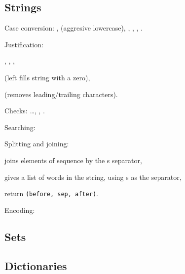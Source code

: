 \subsection{Strings}
\begin{enumx}
\item Case conversion: 
, 
 (aggresive lowercase), 
, 
, 
, 
.

\item Justification: 
\begin{itemx}
	\item {},
		  ,
	      ,

	\item {} 
	(left fills string with a zero),

	\item {} 
	(removes leading/trailing characters).
\end{itemx}

\item Checks:
\ldots,
, 
.

\item Searching:

\item Splitting and joining:
\begin{itemx}
	\item {} joins elements of sequence by the s separator,
	\item {} gives a list of words in the string, using s as the separator,
	\item {} return \texttt{(before, sep, after)}.
\end{itemx}

\item Encoding: 
\end{enumx}

\subsection{Sets}

\subsection{Dictionaries}
